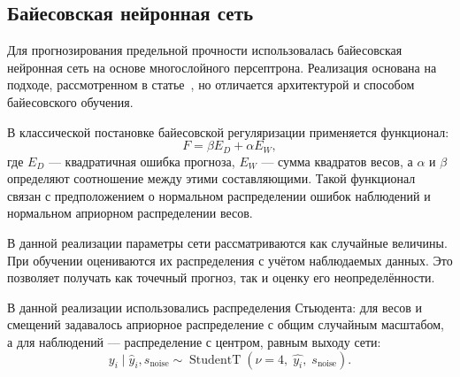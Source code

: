 \subsection{Байесовская нейронная сеть}

Для прогнозирования предельной прочности использовалась
байесовская нейронная сеть на основе многослойного
персептрона. Реализация основана на подходе,
рассмотренном в статье~\cite{BRANN}, но отличается
архитектурой и способом байесовского обучения.





В классической постановке байесовской регуляризации
применяется функционал:
\begin{equation}
    F=\beta E_D+\alpha E_W,
\end{equation}
где $E_D$ --- квадратичная ошибка прогноза,
$E_W$ --- сумма квадратов весов,
а $\alpha$ и $\beta$ определяют соотношение
между этими составляющими.
Такой функционал связан с предположением
о нормальном распределении ошибок наблюдений
и нормальном априорном распределении весов.

В данной реализации параметры сети рассматриваются
как случайные величины. При обучении оцениваются
их распределения с учётом наблюдаемых данных.
Это позволяет получать как точечный прогноз,
так и оценку его неопределённости.

В данной реализации использовались распределения
Стьюдента: для весов и смещений задавалось
априорное распределение с общим случайным масштабом,
а для наблюдений --- распределение с центром, равным выходу сети:
\begin{equation}
    y_i \mid \hat{y}_i, s_{\mathrm{noise}}
    \sim \operatorname{StudentT}
    \left(
        \nu = 4,\;
        \hat{y_i},\;
        s_{\mathrm{noise}}
    \right).
\end{equation}

